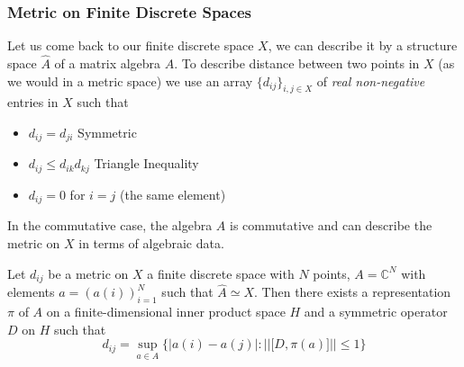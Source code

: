 
\subsubsection{Metric on Finite Discrete Spaces}
Let us come back to our finite discrete space $X$, we can describe it by a
structure space $\hat{A}$ of a matrix algebra $A$. To describe distance between
two points in $X$ (as we would in a metric space) we use an array $\{d_{ij}\}_{i,
j \in X}$ of \textit{real non-negative} entries in $X$ such that
\begin{itemize}
    \item $d_{ij} = d_{ji}$             Symmetric
    \item $d_{ij} \leq d_{ik} d_{kj}$       Triangle Inequality
    \item $d_{ij} = 0$ for $i=j$ (the same element)
\end{itemize}

In the commutative case, the algebra $A$ is commutative and can describe the
metric on $X$ in terms of algebraic data.
\begin{theorem}
    Let $d_{ij}$ be a metric on $X$ a finite discrete space with $N$ points, $A = \mathbb{C}^N$
    with elements $a = (a(i))_{i=1}^N$ such that $\hat{A} \simeq X$. Then there exists a
    representation $\pi$ of $A$ on a finite-dimensional inner product space $H$ and a symmetric
    operator $D$ on $H$ such that
    \begin{equation}
        d_{ij} = \sup_{a\in A}\bigg\{\big|a(i)-a(j)\big| : |\big|\big[D,
            \pi(a)]\big|\big| \leq 1\bigg\}
    \end{equation}
\end{theorem}

